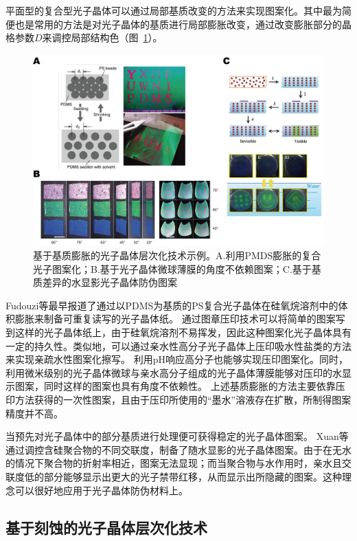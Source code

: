 平面型的复合型光子晶体可以通过局部基质改变的方法来实现图案化。其中最为简便也是常用的方法是对光子晶体的基质进行局部膨胀改变，通过改变膨胀部分的晶格参数$D$来调控局部结构色（图~\ref{fig:matrix_swell}）。
\begin{figure}[b]
	\centering
	\includegraphics[width=0.9\linewidth]{figures/matrix-swell.png}
	\caption{基于基质膨胀的光子晶体层次化技术示例。A.利用PMDS膨胀的复合光子图案化\cite{Fudouzi2003Colloidal}；B.基于光子晶体微球薄膜的角度不依赖图案\cite{Gu2013Tailoring}；C.基于基质差异的水显影光子晶体防伪图案\cite{Xuan2011Invisible}}
	\label{fig:matrix_swell}
\end{figure}
Fudouzi等最早报道了通过以PDMS为基质的PS复合光子晶体在硅氧烷溶剂中的体积膨胀来制备可重复读写的光子晶体纸\cite{Fudouzi2003Colloidal}。
通过图章压印技术可以将简单的图案写到这样的光子晶体纸上，由于硅氧烷溶剂不易挥发，因此这种图案化光子晶体具有一定的持久性。类似地，可以通过亲水性高分子光子晶体上压印吸水性盐类的方法来实现亲疏水性图案化擦写\cite{Ge2009Rewritable}。
利用pH响应高分子也能够实现压印图案化\cite{Liu2007Poly4VinylpyridineBased}。同时，利用微米级别的光子晶体微球与亲水高分子组成的光子晶体薄膜能够对压印的水显示图案\cite{Gu2013Tailoring}，同时这样的图案也具有角度不依赖性。
上述基质膨胀的方法主要依靠压印方法获得的一次性图案，且由于压印所使用的“墨水”溶液存在扩散，所制得图案精度并不高。

当预先对光子晶体中的部分基质进行处理便可获得稳定的光子晶体图案。
Xuan等通过调控含硅聚合物的不同交联度，制备了随水显影的光子晶体图案\cite{Xuan2011Invisible}。由于在无水的情况下聚合物的折射率相近，图案无法显现；而当聚合物与水作用时，亲水且交联度低的部分能够显示出更大的光子禁带红移，从而显示出所隐藏的图案。这种理念可以很好地应用于光子晶体防伪材料上。

\subsection{基于刻蚀的光子晶体层次化技术}
\label{subsec:etch-pattern}


